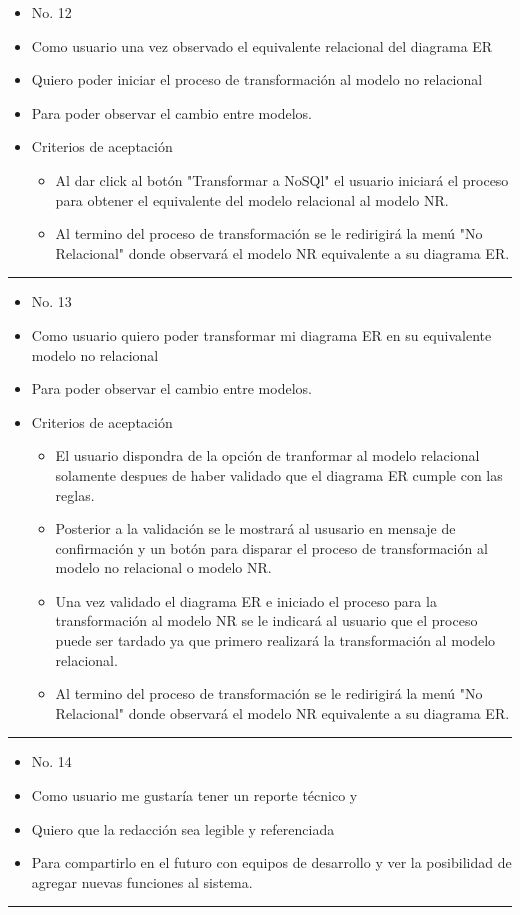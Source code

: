 \begin{itemize}
	\item No. 12
	\item Como usuario una vez observado el equivalente relacional del diagrama ER
	\item Quiero poder iniciar el proceso de transformación al modelo no relacional
	\item Para poder observar el cambio entre modelos.
	\item Criterios de aceptación
	\begin{itemize}
		\item Al dar click al botón "Transformar a NoSQl" el usuario iniciará el proceso para obtener el equivalente del modelo relacional al modelo NR.
		\item Al termino del proceso de transformación se le redirigirá la menú "No Relacional" donde observará el modelo NR equivalente a su diagrama ER.
	\end{itemize}
\end{itemize}
\noindent\rule{\textwidth}{1pt}
\begin{itemize}
	\item No. 13
	\item Como usuario quiero poder transformar mi diagrama ER en su equivalente modelo no relacional
	\item Para poder observar el cambio entre modelos.
	\item Criterios de aceptación
	\begin{itemize}
		\item El usuario dispondra de la opción de tranformar al modelo relacional solamente despues de haber validado que el diagrama ER cumple con las reglas.
		\item Posterior a la validación se le mostrará al ususario en mensaje de confirmación y un botón para disparar el proceso de transformación al modelo no relacional o modelo NR.
		\item Una vez validado el diagrama ER e iniciado el proceso para la transformación al modelo NR se le indicará al usuario que el proceso puede ser tardado ya que primero realizará la transformación al modelo relacional.
		\item Al termino del proceso de transformación se le redirigirá la menú "No Relacional" donde observará el modelo NR equivalente a su diagrama ER.
	\end{itemize}
\end{itemize}
\noindent\rule{\textwidth}{1pt}
\begin{itemize}
	\item No. 14
	\item Como usuario me gustaría tener un reporte técnico y
	\item Quiero que la redacción sea legible y referenciada
	\item Para compartirlo en el futuro con equipos de desarrollo y ver la posibilidad de agregar nuevas funciones al sistema.
\end{itemize}
\noindent\rule{\textwidth}{1pt}




